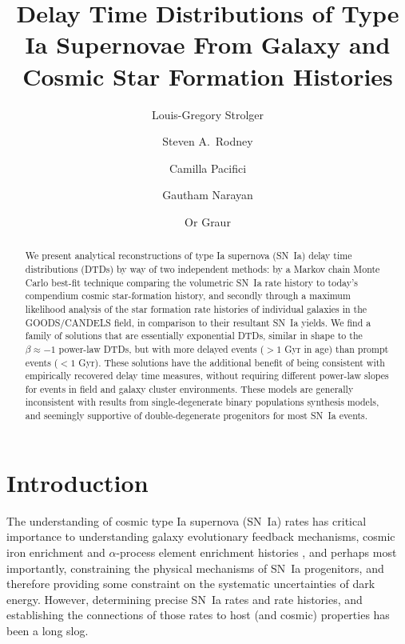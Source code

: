 \documentclass[apj, linenumbers]{aastex62}
\begin{document}
\title{Delay Time Distributions of Type Ia Supernovae From Galaxy and Cosmic Star Formation Histories}
\author[0000-0002-7756-4440]{Louis-Gregory Strolger}

\author{Steven A.~Rodney}

\author{Camilla Pacifici}

\author{Gautham Narayan}

\author{Or Graur}

\begin{abstract}
We present analytical reconstructions of type Ia supernova (SN~Ia) delay time distributions (DTDs) by way of two independent methods: by a Markov chain Monte Carlo best-fit technique comparing the volumetric SN~Ia rate history to today's compendium cosmic star-formation history, and secondly through a maximum likelihood analysis of the star formation rate histories of individual galaxies in the GOODS/CANDELS field, in comparison to their resultant SN~Ia yields. We find a family of solutions that are essentially exponential DTDs, similar in shape to the $\beta\approx-1$ power-law DTDs, but with more delayed events ($>1$ Gyr in age) than prompt events ($<1$ Gyr). These solutions have the additional benefit of being consistent with empirically recovered delay time measures, without requiring different power-law slopes for events in field and galaxy cluster environments. These models are generally inconsistent with results from single-degenerate binary populations synthesis models, and seemingly supportive of double-degenerate progenitors for most SN~Ia events. 

\end{abstract}

\section{Introduction}
The understanding of cosmic type Ia supernova (SN~Ia) rates has critical importance to understanding galaxy evolutionary feedback mechanisms, cosmic iron enrichment and $\alpha$-process element enrichment histories \citep[see][]{Maoz:2017ck}, and perhaps most importantly, constraining the physical mechanisms of SN~Ia progenitors, and therefore providing some constraint on the systematic uncertainties of dark energy. However, determining precise SN~Ia rates and rate histories, and establishing the connections of those rates to host (and cosmic) properties has been a long slog. 
\end{document}
